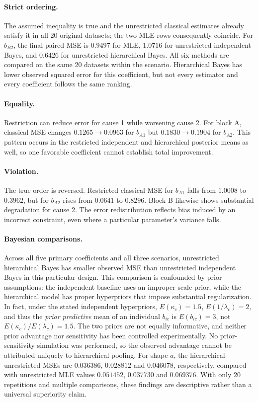 \documentclass[a4paper,11pt]{article}
\begin{document}
\paragraph{Strict ordering.} The assumed inequality is true and the unrestricted classical estimates
already satisfy it in all 20 original datasets; the two MLE rows consequently coincide.
For $b_{B2}$, the final paired MSE is $0.9497$ for MLE, $1.0716$ for unrestricted independent
Bayes, and $0.6426$ for unrestricted hierarchical Bayes. All six methods are compared on the same 20 datasets within the scenario. Hierarchical Bayes has lower observed squared error for this coefficient,
but not every estimator and every coefficient follows the same ranking.

\paragraph{Equality.} Restriction can reduce error for cause 1 while worsening cause 2. For block A,
classical MSE changes $0.1265\to0.0963$ for $b_{A1}$ but $0.1830\to0.1904$ for $b_{A2}$.
This pattern occurs in the restricted independent and hierarchical posterior means as well,
so one favorable coefficient cannot establish total improvement.

\paragraph{Violation.} The true order is reversed. Restricted classical MSE for $b_{A1}$ falls
from $1.0008$ to $0.3962$, but for $b_{A2}$ rises from $0.0641$ to $0.8296$.
Block B likewise shows substantial degradation for cause 2. The error redistribution reflects
bias induced by an incorrect constraint, even where a particular parameter's variance falls.

\paragraph{Bayesian comparisons.} Across all five primary coefficients and all three scenarios, unrestricted hierarchical Bayes has smaller observed MSE than unrestricted independent Bayes in this particular design. This comparison is confounded by prior assumptions: the independent baseline uses an improper scale prior, while the hierarchical model has proper hyperpriors that impose substantial regularization. In fact, under the stated independent hyperpriors, $E(\kappa_c)=1.5$, $E(1/\lambda_c)=2$, and thus the \emph{prior predictive} mean of an individual $b_{ic}$ is $E(b_{ic})=3$, not $E(\kappa_c)/E(\lambda_c)=1.5$. The two priors are not equally informative, and neither prior advantage nor sensitivity has been controlled experimentally. No prior-sensitivity simulation was performed, so the observed advantage cannot be attributed uniquely to hierarchical pooling. For shape $a$, the hierarchical-unrestricted MSEs are
$0.036386$, $0.028812$ and $0.046078$, respectively, compared with unrestricted MLE values
$0.051452$, $0.037730$ and $0.069376$. With only 20 repetitions and multiple comparisons,
these findings are descriptive rather than a universal superiority claim.
\end{document}

